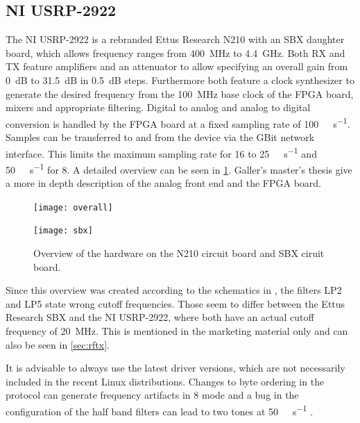 \documentclass[12pt,a4paper,parskip=full]{scrartcl}
\begin{document}
\subsection{NI USRP-2922}
The NI USRP-2922 is a rebranded Ettus Research N210 with an SBX daughter board, which
allows frequency ranges from \SI{400}{\mega\hertz} to \SI{4.4}{\giga\hertz}. Both RX
and TX feature amplifiers and an attenuator to allow specifying an overall gain from
\SI{0}{\deci\bel} to \SI{31.5}{\deci\bel} in \SI{0.5}{\deci\bel} steps. Furthermore
both feature a clock synthesizer to generate the desired frequency from the \SI{100}{\mega\hertz}
base clock of the FPGA board, mixers and appropriate filtering. Digital to analog and analog to
digital conversion is handled by the FPGA board at a fixed sampling rate of
\SI{100}{\mega\samples\per\second}. Samples can be transferred to and from the device via the
GBit network interface. This limits the maximum sampling rate for \SI{16}{\bit} to
\SI{25}{\mega\samples\per\second} and \SI{50}{\mega\samples\per\second} for \SI{8}{\bit}.
A detailed overview can be seen in \cref{fig:usrp}. Galler's master's thesis \cite{flo}
give a more in depth description of the analog front end and the FPGA board.
\begin{figure}[htb]
    \centering
    \begin{minipage}{0.45\textwidth}
        \centering
        \texttt{[image: overall]}
    \end{minipage}
    \begin{minipage}{0.45\textwidth}
        \centering
        \texttt{[image: sbx]}
    \end{minipage}
    \caption{Overview of the hardware on the N210 circuit board and SBX ciruit board\cite{flo}.}
    \label{fig:usrp}
\end{figure}
Since this overview was created according
to the schematics in \cite{sch_sbx}, the filters LP2 and LP5 state wrong cutoff frequencies.
Those seem to differ between the Ettus Research SBX and the NI USRP-2922, where both have an
actual cutoff frequency of \SI{20}{\mega\hertz}. This is mentioned in the marketing material
\cite{ni_29xx} only and can also be seen in \cref{sec:rftx}. %


It is advisable to always use the latest driver versions, which are not necessarily included in
the recent Linux distributions. Changes to byte ordering in the protocol \cite{usrp_byte} can
generate frequency artifacts in \SI{8}{\bit} mode and a bug in the configuration of the half
band filters can lead to two tones at \SI{50}{\mega\samples\per\second} \cite{usrp_hb}.
\end{document}
